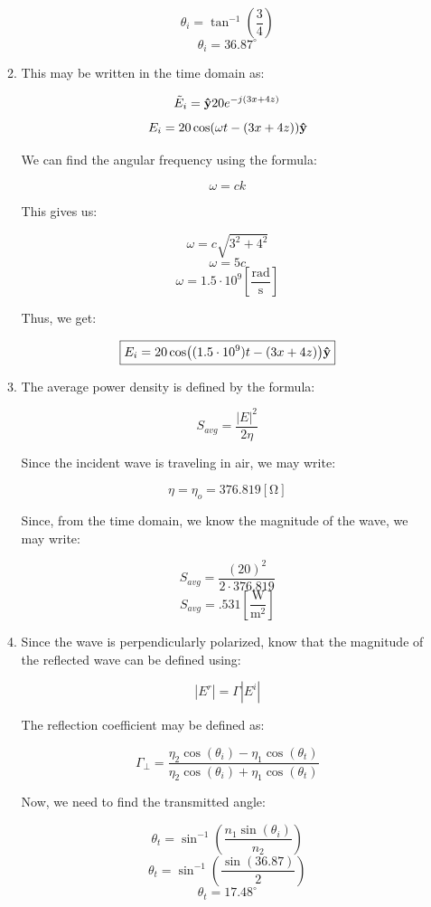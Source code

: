 \begin{enumerate}
\begin{enumerate}
        $$\theta_i=\tan^{-1}\left( \frac{3}{4} \right)$$
        $$\boxed{\theta_i=36.87^{\circ}}$$

      \item 

        This may be written in the time domain as:

        $$\tilde{E}_i=\bold{\hat{y}}20e^{-j(3x+4z)}$$
        $$E_i=20\cos(\omega t-(3x+4z))\bold{\hat{y}}$$

        We can find the angular frequency using the formula:

        $$\omega=ck$$

        This gives us:

        $$\omega=c\sqrt{3^2+4^2}$$
        $$\omega=5c$$
        $$\omega=1.5\cdot10^{9}\left[ \frac{\text{rad}}{\si{\second}} \right]$$

        Thus, we get:

        $$\boxed{E_i=20\cos((1.5\cdot10^9) t-(3x+4z))\bold{\hat{y}}}$$

      \item 

        The average power density is defined by the formula:

        $$S_{avg}=\frac{|E|^2}{2\eta}$$

        Since the incident wave is traveling in air, we may write:

        $$\eta=\eta_o=376.819[\si{\ohm}]$$

        Since, from the time domain, we know the magnitude of the wave, we may write:

        $$S_{avg}=\frac{(20)^2}{2\cdot376.819}$$
        $$\boxed{S_{avg}=.531\left[ \frac{\si{\watt}}{\si{\meter\squared}} \right]}$$

      \item 

        Since the wave is perpendicularly polarized, know that the magnitude of the reflected wave can be defined using:

        $$|E^r|=\Gamma|E^i|$$

        The reflection coefficient may be defined as:

        $$\Gamma_{\perp}=\frac{\eta_2\cos(\theta_i)-\eta_1\cos(\theta_t)}{\eta_2\cos(\theta_i)+\eta_1\cos(\theta_t)}$$

        Now, we need to find the transmitted angle:

        $$\theta_t=\sin^{-1}\left( \frac{n_1\sin(\theta_i)}{n_2} \right)$$
        $$\theta_t=\sin^{-1}\left( \frac{\sin(36.87)}{2} \right)$$
        $$\theta_t=17.48^{\circ}$$


\end{enumerate}
\end{enumerate}
